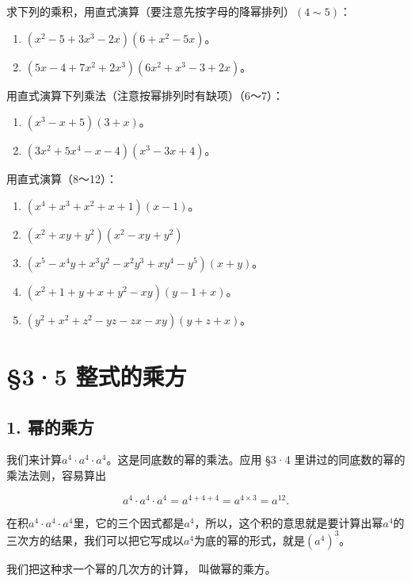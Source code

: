 求下列的乘积，用直式演算（要注意先按字母的降幂排列）\((4\sim5)\)：

\begin{enumerate}[start=4]
\item
  \((x^{2} - 5 + 3x^{3} - 2x)(6 + x^{2} - 5x)\)。
\item
  \((5x - 4 + 7x^{2} + 2x^{3})(6x^{2} + x^{3} - 3 + 2x)\)。
\end{enumerate}

用直式演算下列乘法（注意按幂排列时有缺项）（6～7）：

\begin{enumerate}[start=6]
\item
  \((x^{3} - x + 5)(3 + x)\)。
\item
  \((3x^{2} + 5x^{4} - x - 4)(x^{3} - 3x + 4)\)。
\end{enumerate}

用直式演算（8～12）：

\begin{enumerate}[start=8]
\item
  \((x^{4} + x^{3} + x^{2} + x + 1)(x - 1)\)。
\item
  \((x^{2} + xy + y^{2})(x^{2} - xy + y^{2})\)
\item
  \((x^{5} - x^{4}y + x^{3}y^{2} - x^{2}y^{3} + xy^{4} - y^{5})(x + y)\)。
\item
  \((x^{2} + 1 + y + x + y^{2} - xy)(y - 1 + x)\)。
\item
  \((y^{2} + x^{2} + z^{2} - yz - zx - xy)(y + z + x)\)。
\end{enumerate}

\section{§3·5 整式的乘方}

\subsection{1. 幂的乘方}

我们来计算\(a^4 \cdot a^4 \cdot a^4\)。这是同底数的幂的乘法。应用 §3·4
里讲过的同底数的幂的乘法法则，容易算出

\[
a ^{4} \cdot a ^{4} \cdot a ^{4} = a ^{4 + 4 + 4} = a ^{4 \times 3} = a ^{12}.
\]

在积\(a^4 \cdot a^4 \cdot a^4\)里，它的三个因式都是\(a^4\)，所以，这个积的意思就是要计算出幂\(a^4\)的三次方的结果，我们可以把它写成以\(a^4\)为底的幂的形式，就是\((a^4)^3\)。

我们把这种求一个幂的几次方的计算， 叫做幂的乘方。

